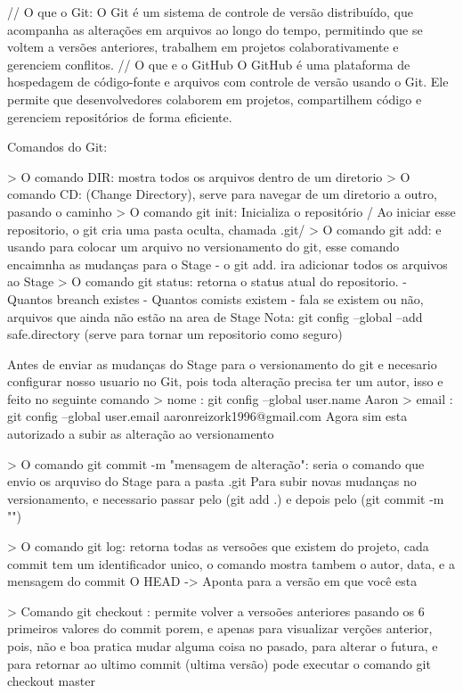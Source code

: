 // O que o Git:
O Git é um sistema de controle de versão distribuído, que acompanha as alterações em arquivos ao longo do tempo, 
permitindo que se voltem a versões anteriores, trabalhem em projetos colaborativamente e gerenciem conflitos.
// O que e o GitHub
O GitHub é uma plataforma de hospedagem de código-fonte e arquivos com controle de versão usando o Git. 
Ele permite que desenvolvedores colaborem em projetos, compartilhem código e gerenciem repositórios de forma eficiente.

Comandos do Git:

> O comando DIR: mostra todos os arquivos dentro de um diretorio
> O comando CD: (Change Directory), serve para navegar de um diretorio a outro, pasando o caminho
> O comando git init: Inicializa o repositório / Ao iniciar esse repositorio, o git cria uma pasta oculta, chamada .git/
> O comando git add:  e usando para colocar um arquivo no versionamento do git, esse comando encaimnha as mudanças para o Stage
    - o git add. ira adicionar todos os arquivos ao Stage 
> O comando git status: retorna o status atual do repositorio. 
    - Quantos breanch existes
    - Quantos comists existem
    - fala se existem ou não, arquivos que ainda não estão na area de Stage
Nota: git config --global --add safe.directory (serve para tornar um repositorio como seguro)

Antes de enviar as mudanças do Stage para o versionamento do git e necesario configurar nosso
usuario no Git, pois toda alteração precisa ter um autor, isso e feito no seguinte comando
> nome : git config --global user.name Aaron
> email : git config --global user.email aaronreizork1996@gmail.com
Agora sim esta autorizado a subir as alteração ao versionamento

> O comando git commit -m "mensagem de alteração": seria  o comando que envio os arquviso do Stage para a pasta .git
Para subir novas mudanças no versionamento, e necessario passar pelo (git add .) e depois pelo (git commit -m "")

> O comando git log: retorna todas as versoões que existem do projeto, cada commit tem um identificador
unico, o comando mostra tambem o autor, data, e a mensagem do commit 
O HEAD -> Aponta para a versão em que você esta

> Comando git checkout : permite volver a versoões anteriores pasando os 6 primeiros valores do commit
porem, e apenas para visualizar verções anterior, pois, não e boa pratica mudar alguma coisa
no pasado, para alterar o futura, e para retornar ao ultimo commit (ultima versão) pode executar o 
comando git checkout master


